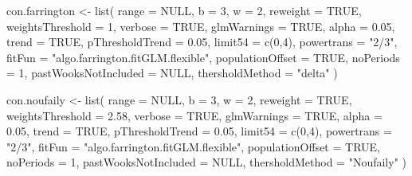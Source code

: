 \documentclass[a4paper,twoside,11pt]{report} %
\newenvironment{Shaded}{\begin{snugshade}}{\end{snugshade}}
\newcommand{\AttributeTok}[1]{\textcolor[rgb]{0.77,0.63,0.00}{#1}}
\newcommand{\ConstantTok}[1]{\textcolor[rgb]{0.00,0.00,0.00}{#1}}
\newcommand{\DecValTok}[1]{\textcolor[rgb]{0.00,0.00,0.81}{#1}}
\newcommand{\FloatTok}[1]{\textcolor[rgb]{0.00,0.00,0.81}{#1}}
\newcommand{\FunctionTok}[1]{\textcolor[rgb]{0.00,0.00,0.00}{#1}}
\newcommand{\NormalTok}[1]{#1}
\newcommand{\OtherTok}[1]{\textcolor[rgb]{0.56,0.35,0.01}{#1}}
\newcommand{\StringTok}[1]{\textcolor[rgb]{0.31,0.60,0.02}{#1}}
\theoremstyle{definition}
\theoremstyle{definition}
\theoremstyle{definition}
\theoremstyle{definition}
\theoremstyle{remark}
\begin{document}
\begin{Shaded}
\begin{Highlighting}[]
\NormalTok{con.farrington }\OtherTok{\textless{}{-}} \FunctionTok{list}\NormalTok{(}
  \AttributeTok{range =} \ConstantTok{NULL}\NormalTok{, }\AttributeTok{b =} \DecValTok{3}\NormalTok{, }\AttributeTok{w =} \DecValTok{2}\NormalTok{,}
  \AttributeTok{reweight =} \ConstantTok{TRUE}\NormalTok{, }\AttributeTok{weightsThreshold =} \DecValTok{1}\NormalTok{,}
  \AttributeTok{verbose =} \ConstantTok{TRUE}\NormalTok{, }\AttributeTok{glmWarnings =} \ConstantTok{TRUE}\NormalTok{,}
  \AttributeTok{alpha =} \FloatTok{0.05}\NormalTok{, }\AttributeTok{trend =} \ConstantTok{TRUE}\NormalTok{, }\AttributeTok{pThresholdTrend =} \FloatTok{0.05}\NormalTok{,}
  \AttributeTok{limit54 =} \FunctionTok{c}\NormalTok{(}\DecValTok{0}\NormalTok{,}\DecValTok{4}\NormalTok{), }\AttributeTok{powertrans =} \StringTok{"2/3"}\NormalTok{,}
  \AttributeTok{fitFun =} \StringTok{"algo.farrington.fitGLM.flexible"}\NormalTok{,}
  \AttributeTok{populationOffset =} \ConstantTok{TRUE}\NormalTok{,}
  \AttributeTok{noPeriods =} \DecValTok{1}\NormalTok{, }\AttributeTok{pastWooksNotIncluded =} \ConstantTok{NULL}\NormalTok{,}
  \AttributeTok{thersholdMethod =} \StringTok{"delta"}
\NormalTok{)}

\NormalTok{con.noufaily }\OtherTok{\textless{}{-}} \FunctionTok{list}\NormalTok{(}
  \AttributeTok{range =} \ConstantTok{NULL}\NormalTok{, }\AttributeTok{b =} \DecValTok{3}\NormalTok{, }\AttributeTok{w =} \DecValTok{2}\NormalTok{,}
  \AttributeTok{reweight =} \ConstantTok{TRUE}\NormalTok{, }\AttributeTok{weightsThreshold =} \FloatTok{2.58}\NormalTok{,}
  \AttributeTok{verbose =} \ConstantTok{TRUE}\NormalTok{, }\AttributeTok{glmWarnings =} \ConstantTok{TRUE}\NormalTok{,}
  \AttributeTok{alpha =} \FloatTok{0.05}\NormalTok{, }\AttributeTok{trend =} \ConstantTok{TRUE}\NormalTok{, }\AttributeTok{pThresholdTrend =} \FloatTok{0.05}\NormalTok{,}
  \AttributeTok{limit54 =} \FunctionTok{c}\NormalTok{(}\DecValTok{0}\NormalTok{,}\DecValTok{4}\NormalTok{), }\AttributeTok{powertrans =} \StringTok{"2/3"}\NormalTok{,}
  \AttributeTok{fitFun =} \StringTok{"algo.farrington.fitGLM.flexible"}\NormalTok{,}
  \AttributeTok{populationOffset =} \ConstantTok{TRUE}\NormalTok{,}
  \AttributeTok{noPeriods =} \DecValTok{1}\NormalTok{, }\AttributeTok{pastWooksNotIncluded =} \ConstantTok{NULL}\NormalTok{,}
  \AttributeTok{thersholdMethod =} \StringTok{"Noufaily"}
\NormalTok{)}
\end{Highlighting}
\end{Shaded}
\end{document}
